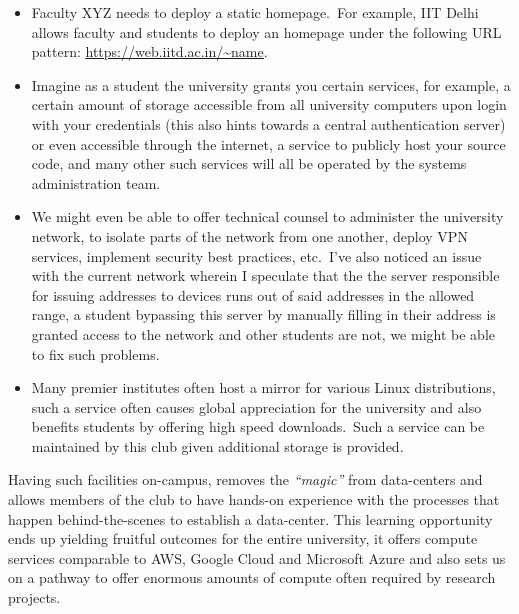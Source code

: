 \documentclass[11pt,twocolumn,oneside]{book}
\begin{document}
    \begin{itemize}
        \item Faculty XYZ needs to deploy a static homepage.\ For example, IIT Delhi allows faculty and students to
        deploy an homepage under the following URL pattern:
        \href{https://web.iitd.ac.in/~name}{\color{blue}\underline{\url{https://web.iitd.ac.in/~name}}}.
        \item Imagine as a student the university grants you certain services, for example, a certain amount of storage
        accessible from all university computers upon login with your credentials (this also hints towards a central
        authentication server) or even accessible through the internet, a service to publicly host your source code,
        and many other such services will all be operated by the systems administration team.
        \item We might even be able to offer technical counsel to administer the university network, to isolate parts of
        the network from one another, deploy VPN services, implement security best practices, etc.\ I've also noticed an
        issue with the current network wherein I speculate that the the server responsible for issuing addresses to
        devices runs out of said addresses in the allowed range, a student bypassing this server by manually filling in
        their address is granted access to the network and other students are not, we might be able to fix such
        problems.
        \item Many premier institutes often host a mirror for various Linux distributions, such a service often causes
        global appreciation for the university and also benefits students by offering high speed downloads.\ Such a
        service can be maintained by this club given additional storage is provided.
    \end{itemize}

    Having such facilities on-campus, removes the \emph{``magic''} from data-centers and allows members of the
    club to have hands-on experience with the processes that happen behind-the-scenes to establish a data-center.
    This learning opportunity ends up yielding fruitful outcomes for the entire university, it offers compute
    services comparable to AWS, Google Cloud and Microsoft Azure and also sets us on a pathway to offer enormous
    amounts of compute often required by research projects.
\end{document}

